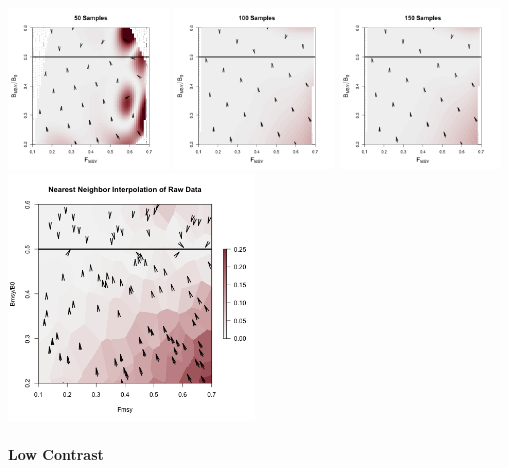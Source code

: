 \includegraphics[width=0.32\textwidth]{../edits/directionalBiasSubPTExpT45MinConnF1.png}
\includegraphics[width=0.32\textwidth]{../edits/directionalBiasSubPTExpT45MinCon.png}
\includegraphics[width=0.32\textwidth]{../edits/directionalBiasSubPTExpT45MinCon2X.png}\\
\includegraphics[width=0.49\textwidth]{../edits/obsDirectionalBiasSubExpT45MinCon2X.png}

%
\paragraph{Low Contrast}

